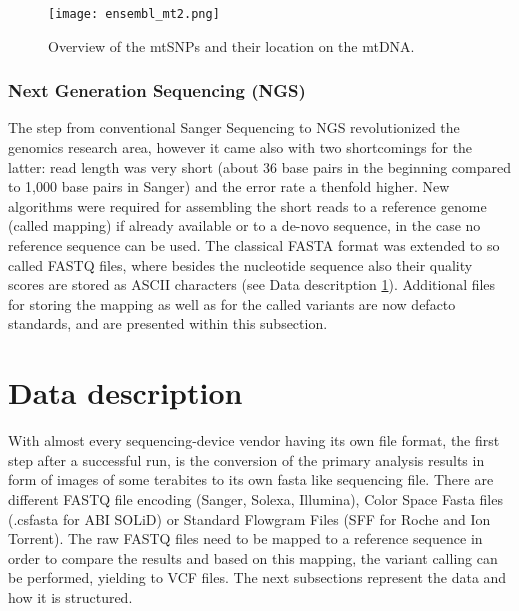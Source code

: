 \begin{figure}[ht]
\begin{center}
\texttt{[image: ensembl\_mt2.png]}
\caption[mtSNPs location on mtDNA]{Overview of the mtSNPs and their location on the mtDNA.}
\label{fig:figureSNPlocation}
\end{center}
\end{figure}

\subsubsection{Next Generation Sequencing (NGS)}
The step from conventional Sanger Sequencing to NGS revolutionized the genomics research area, however it came also with two shortcomings for the latter: read length was very short (about 36 base pairs\cite{Li2013a} in the beginning compared to 1,000 base pairs in Sanger) and the error rate a thenfold higher. New algorithms were required for assembling the short reads to a reference genome (called mapping) if already available or to a de-novo sequence, in the case no reference sequence can be used. The classical FASTA format was extended to so called FASTQ files, where besides the nucleotide sequence also their quality scores are stored as ASCII characters (see Data descritption \ref{datadescription}). Additional files for storing the mapping as well as for the called variants are now defacto standards, and are presented within this subsection. 
\section{Data description}\label{datadescription}
With almost every sequencing-device vendor having its own file format, the first step after a successful run, is the conversion of the primary analysis results in form of images of some terabites to its own fasta like sequencing file. There are different FASTQ file encoding (Sanger, Solexa, Illumina), Color Space Fasta files (.csfasta for ABI SOLiD) or Standard Flowgram Files (SFF for Roche and Ion Torrent). The raw FASTQ files need to be mapped to a reference sequence in order to compare the results and based on this mapping, the variant calling can be performed, yielding to VCF files. The next subsections represent the data and how it is structured. 
